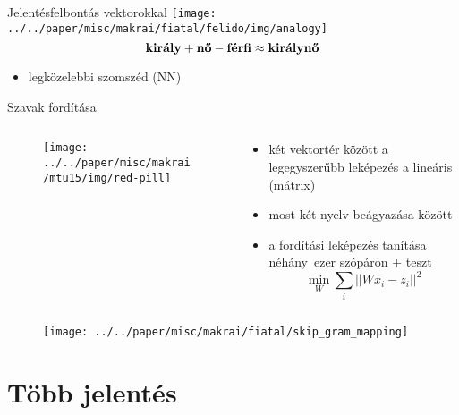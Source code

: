 \documentclass{beamer}
\newcommand{\Ro}{\mathbb{R}^{d_1}}
\newcommand{\Rt}{\mathbb{R}^{d_2}}
\begin{document}
\begin{frame}{Jelentésfelbontás vektorokkal}{\citep{Mikolov:2013l}}
         \cite{Katz:1963}
  \texttt{[image: ../../paper/misc/makrai/fiatal/felido/img/analogy]}
      \[\text{\bf király} + \text{\bf nő} - \text{\bf férfi} \approx 
      \text{\bf királynő}\]
      \begin{itemize}
        \item legközelebbi szomszéd (NN)
      \end{itemize}
\end{frame}


\begin{frame}%
  {Szavak fordítása \citep{Mikolov:2013x}}
    \begin{columns}
      \begin{column}{.4\textwidth}
        \begin{figure}
          \centering
          \texttt{[image: ../../paper/misc/makrai/mtu15/img/red-pill]} 
        \end{figure}
      \end{column}
      \pause
      \begin{column}{.6\textwidth}
        \begin{itemize}
          \item két vektortér között a legegyszerűbb leképezés a lineáris (mátrix)
          \item most két nyelv beágyazása között
          \item a fordítási leképezés tanítása néhány~ezer szópáron + teszt
            \[\min_W \sum_i || Wx_i - z_i ||^2 \]
        \end{itemize}
      \end{column}
    \end{columns}
    \begin{figure}
      \texttt{[image: ../../paper/misc/makrai/fiatal/skip\_gram\_mapping]}
    \end{figure}
\end{frame}

\section{Több jelentés}
\end{document}
